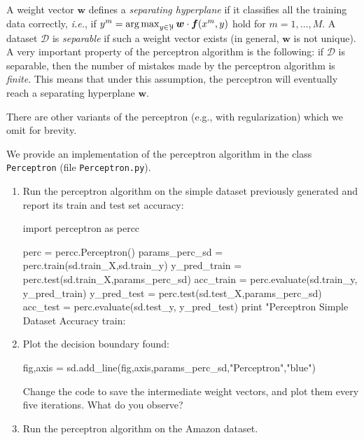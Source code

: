 A weight vector $\boldsymbol{w}$ defines a \emph{separating hyperplane} if it classifies 
all the training data correctly, \emph{i.e.}, if $y^m = \operatorname*{arg\,max}_{y \in \mathcal{Y}} \boldsymbol{w} \cdot \boldsymbol{f}(x^m,y)$ 
hold for $m = 1,\ldots,M$. A dataset $\mathcal{D}$ is \emph{separable} 
if such a weight vector exists (in general, $\boldsymbol{w}$ is not unique). 
A very important property of the perceptron algorithm is the following: 
if $\mathcal{D}$ is separable, then the 
number of mistakes made by the perceptron algorithm is \emph{finite}.  
This means that under this assumption, the perceptron will eventually reach a separating hyperplane $\boldsymbol{w}$. 


There are other variants of the perceptron (e.g., with regularization) which we omit for brevity. 

\begin{exercise}
We provide an implementation of the perceptron algorithm in the class {\tt Perceptron} 
(file {\tt Perceptron.py}).  
\begin{enumerate}
\item Run the perceptron algorithm on the simple dataset
previously generated and report its train and test set accuracy: 
\begin{python}
import perceptron as percc

perc = percc.Perceptron()
params_perc_sd = perc.train(sd.train_X,sd.train_y)
y_pred_train = perc.test(sd.train_X,params_perc_sd)
acc_train = perc.evaluate(sd.train_y, y_pred_train)
y_pred_test = perc.test(sd.test_X,params_perc_sd)
acc_test = perc.evaluate(sd.test_y, y_pred_test)
print "Perceptron Simple Dataset Accuracy train: %
\end{python}

\item Plot the decision boundary found:
\begin{python}
fig,axis = sd.add_line(fig,axis,params_perc_sd,"Perceptron","blue")
\end{python}
Change the code to save the intermediate weight vectors,
and plot them every five iterations. What do you observe?

\item Run the perceptron algorithm on the Amazon dataset. 
\end{enumerate}
\end{exercise}

